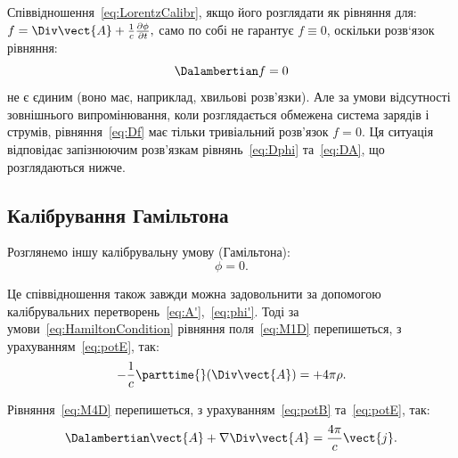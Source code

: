 Співвідношення~\eqref{eq:LorentzCalibr}, якщо його розглядати як рівняння для:
\(
f = \Div \vect{A} + \frac{1}{c} \frac{\partial \phi}{\partial t},
\)
само по собі не гарантує $f \equiv 0$, оскільки розв`язок рівняння:
\begin{equation}\label{eq:Df}
	\Dalambertian f = 0
\end{equation}
не є єдиним (воно має, наприклад, хвильові розв'язки). Але за умови відсутності зовнішнього
випромінювання, коли розглядається обмежена система зарядів і струмів, рівняння~\eqref{eq:Df} має тільки тривіальний
розв'язок $f=0$. Ця ситуація відповідає запізнюючим розв'язкам рівнянь~\eqref{eq:Dphi} та~\eqref{eq:DA}, що
розглядаються нижче.



\subsection*{Калібрування Гамільтона}

Розглянемо іншу калібрувальну умову (Гамільтона):
\begin{equation}\label{eq:HamiltonCondition}
	\phi = 0.
\end{equation}

Це співвідношення також завжди можна задовольнити за допомогою калібрувальних
перетворень~\eqref{eq:A'},~\eqref{eq:phi'}. Тоді за умови~\eqref{eq:HamiltonCondition} рівняння поля~\eqref{eq:M1D}
перепишеться, з урахуванням~\eqref{eq:potE}, так:
\begin{equation}\label{eq:DA_for_Hamilton}
	-\frac1c \parttime{} (\Div \vect{A}) = +4\pi \rho.
\end{equation}

Рівняння~\eqref{eq:M4D} перепишеться, з урахуванням~\eqref{eq:potB} та~\eqref{eq:potE}, так:
\begin{equation}\label{eq:DA_for_Hamilton1}
	\Dalambertian \vect{A}  + \nabla \Div\vect{A} = \frac{4\pi}{c} \vect{j}.
\end{equation}

